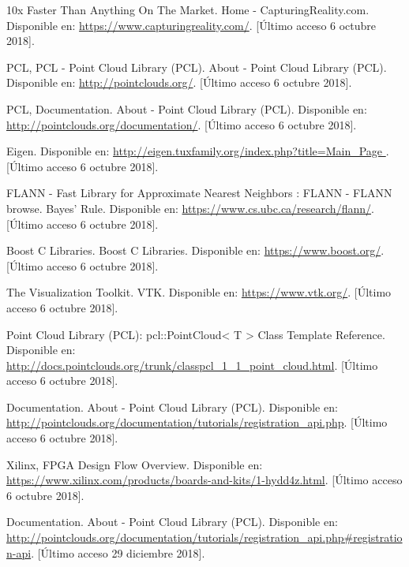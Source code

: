 \begin{thebibliography}{99}


 10x Faster Than Anything On The Market. Home - CapturingReality.com. Disponible en: \url{https://www.capturingreality.com/}. [Último acceso 6 octubre 2018].


 PCL, PCL - Point Cloud Library (PCL). About - Point Cloud Library (PCL). Disponible en: \url{http://pointclouds.org/}. [Último acceso 6 octubre 2018].


 PCL, Documentation. About - Point Cloud Library (PCL). Disponible en: \url{http://pointclouds.org/documentation/}. [Último acceso 6 octubre 2018].



 Eigen. Disponible en: \url{ http://eigen.tuxfamily.org/index.php?title=Main_Page }. [Último acceso 6 octubre 2018].

 FLANN - Fast Library for Approximate Nearest Neighbors : FLANN - FLANN browse. Bayes' Rule. Disponible en: \url{https://www.cs.ubc.ca/research/flann/}. [Último acceso 6 octubre 2018].

 Boost C Libraries. Boost C Libraries. Disponible en: \url{ https://www.boost.org/}. [Último acceso 6 octubre 2018].


 The Visualization Toolkit. VTK. Disponible en: \url{https://www.vtk.org/}. [Último acceso 6 octubre 2018].

 Point Cloud Library (PCL): pcl::PointCloud< T > Class Template Reference. Disponible en: \url{http://docs.pointclouds.org/trunk/classpcl_1_1_point_cloud.html}. [Último acceso 6 octubre 2018].


 Documentation. About - Point Cloud Library (PCL). Disponible en: \url{http://pointclouds.org/documentation/tutorials/registration_api.php}. [Último acceso 6 octubre 2018].


Xilinx, FPGA Design Flow Overview. Disponible en: \url{https://www.xilinx.com/products/boards-and-kits/1-hydd4z.html}. [Último acceso 6 octubre 2018].



 Documentation. About - Point Cloud Library (PCL). Disponible en: \url{http://pointclouds.org/documentation/tutorials/registration_api.php#registration-api}. [Último acceso 29 diciembre 2018].




\end{thebibliography}
